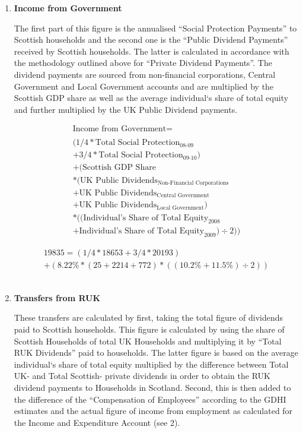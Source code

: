 \begin{enumerate}
\item \textbf {Income from Government}

The first part of this figure is the annualised ``Social Protection Payments'' to Scottish households and the second one is the ``Public Dividend Payments'' received by Scottish households. The latter is calculated in accordance with the methodology outlined above for ``Private Dividend Payments''. The dividend payments are sourced from non-financial corporations, Central Government and Local Government accounts and are multiplied by the Scottish GDP share as well as the average individual`s share of total equity and further multiplied by the UK Public Dividend payments.  \cite{ScotGov2013b,ONS2011c}

\begin{equation}
\begin{split}
\text{Income from Government} =  \\ \\
(1/4*\text{Total Social Protection}_\text{08-09}\\
+3/4*\text{Total Social Protection}_\text{09-10})\\
+(\text{Scottish GDP Share} \\
*(\text{UK Public Dividends}_\text{Non-Financial Corporations}\\
+\text{UK Public Dividends}_\text{Central Government}\\
+\text{UK Public Dividends}_\text{Local Government})\\
*((\text{Individual's Share of Total Equity}_\text{2008}\\
+\text{Individual's Share of Total Equity}_\text{2009})\div 2))
\end{split} \label{eq:2.5.8}
\end{equation}


\begin{equation} \nonumber
\begin{split}
19835 = (1/4*18653+3/4*20193)\\
+(8.22\%*(25+2214+772)*((10.2\%+11.5\%)\div 2))
\end{split}
\end{equation}\\


\item \textbf {Transfers from RUK}

These transfers are calculated by first, taking the total figure of dividends paid to Scottish households. This figure is calculated by using the share of Scottish Households of total UK Households and multiplying it by ``Total RUK Dividends'' paid to households. The latter figure is based on the average individual`s share of total equity multiplied by the difference between Total UK- and Total Scottish- private dividends in order to obtain the RUK dividend payments to Households in Scotland. 
Second, this is then added to the difference of the ``Compensation of Employees'' according to the GDHI estimates and the actual figure of income from employment as calculated for the Income and Expenditure Account (see 2).
\cite{ONS2011c,ONS2011a,ONS2011b}



\end{enumerate}
